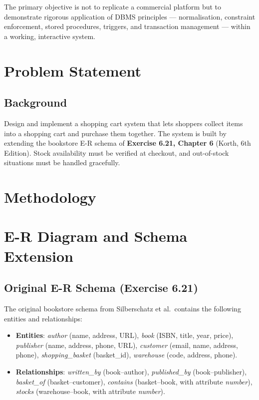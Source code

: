 \documentclass[12pt, a4paper]{article}
\begin{document}
The primary objective is not to replicate a commercial platform but to
demonstrate rigorous application of DBMS principles --- normalisation,
constraint enforcement, stored procedures, triggers, and transaction
management --- within a working, interactive system.

\section{Problem Statement}
\subsection{Background}
Design and implement a shopping cart system that lets shoppers collect items into a
shopping cart and purchase them together. The system is built by extending the
bookstore E-R schema of \textbf{Exercise 6.21, Chapter 6} (Korth, 6th Edition).
Stock availability must be verified at checkout, and out-of-stock situations must be
handled gracefully.


\section{Methodology}


\section{E-R Diagram and Schema Extension}

\subsection{Original E-R Schema (Exercise 6.21)}

The original bookstore schema from Silberschatz et al.\ contains the following
entities and relationships:

\begin{itemize}
    \item \textbf{Entities}: \textit{author} (name, address, URL),
          \textit{book} (ISBN, title, year, price),
          \textit{publisher} (name, address, phone, URL),
          \textit{customer} (email, name, address, phone),
          \textit{shopping\_basket} (basket\_id),
          \textit{warehouse} (code, address, phone).
    \item \textbf{Relationships}: \textit{written\_by} (book--author),
          \textit{published\_by} (book--publisher),
          \textit{basket\_of} (basket--customer),
          \textit{contains} (basket--book, with attribute \textit{number}),
          \textit{stocks} (warehouse--book, with attribute \textit{number}).
\end{itemize}
\end{document}
